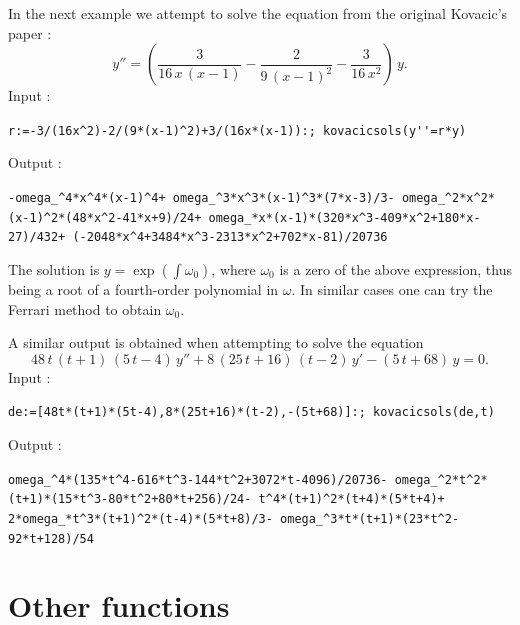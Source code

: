 \documentclass[a4paper,11pt]{book}
\begin{document}
In the next example we attempt to solve the equation from the original Kovacic's paper :
\[ y''=\left(\frac{3}{16\,x\,(x-1)}-\frac{2}{9\,(x-1)^2}-\frac{3}{16\,x^2}\right)\,y. \]
Input :
\begin{center}
  \tt r:=-3/(16x\verb|^|2)-2/(9*(x-1)\verb|^|2)+3/(16x*(x-1)):; kovacicsols(y\verb|''|=r*y)
\end{center}
Output :
\begin{center}
  \tt -omega\_\verb|^|4*x\verb|^|4*(x-1)\verb|^|4+ omega\_\verb|^|3*x\verb|^|3*(x-1)\verb|^|3*(7*x-3)/3- omega\_\verb|^|2*x\verb|^|2*(x-1)\verb|^|2*(48*x\verb|^|2-41*x+9)/24+ omega\_*x*(x-1)*(320*x\verb|^|3-409*x\verb|^|2+180*x-27)/432+ (-2048*x\verb|^|4+3484*x\verb|^|3-2313*x\verb|^|2+702*x-81)/20736
\end{center}
The solution is $y=\exp\left(\int\omega_0\right)$, where $\omega_0$ is a zero of the above expression, thus being a root of a fourth-order polynomial in $\omega$. In similar cases one can try the Ferrari method to obtain $\omega_0$.

A similar output is obtained when attempting to solve the equation
\[ 48\,t\,(t+1)\,(5\,t-4)\,y''+8\,(25\,t+16)\,(t-2)\,y'-(5\,t+68)\,y=0. \]
Input :
\begin{center}
  \tt de:=[48t*(t+1)*(5t-4),8*(25t+16)*(t-2),-(5t+68)]:; kovacicsols(de,t)
\end{center}
Output :
\begin{center}
  \tt omega\_\verb|^|4*(135*t\verb|^|4-616*t\verb|^|3-144*t\verb|^|2+3072*t-4096)/20736- omega\_\verb|^|2*t\verb|^|2*(t+1)*(15*t\verb|^|3-80*t\verb|^|2+80*t+256)/24- t\verb|^|4*(t+1)\verb|^|2*(t+4)*(5*t+4)+ 2*omega\_*t\verb|^|3*(t+1)\verb|^|2*(t-4)*(5*t+8)/3- omega\_\verb|^|3*t*(t+1)*(23*t\verb|^|2-92*t+128)/54
\end{center}

\section{Other functions}
\end{document}
